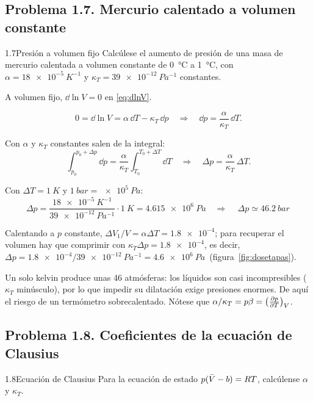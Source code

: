 \subsection{Problema 1.7. Mercurio calentado a volumen constante}
\begin{problema}{1.7}{Presión a volumen fijo}
Calcúlese el aumento de presión de una masa de mercurio calentada a volumen constante de
\SI{0}{\celsius} a \SI{1}{\celsius}, con $\alpha=\SI{18e-5}{K^{-1}}$ y $\kappa_T=\SI{39e-12}{Pa^{-1}}$ constantes.
\end{problema}

\begin{resolucion}
\idea A volumen fijo, $\dd\ln V=0$ en \eqref{eq:dlnV}.

\[
  0=\dd\ln V=\alpha\,\dd T-\kappa_T\,\dd p\quad\Longrightarrow\quad\dd p=\frac{\alpha}{\kappa_T}\,\dd T.
\]

 Con $\alpha$ y $\kappa_T$ constantes salen de la integral:
\[
  \int_{p_0}^{p_0+\Delta p}\dd p=\frac{\alpha}{\kappa_T}\int_{T_0}^{T_0+\Delta T}\dd T
  \quad\Longrightarrow\quad\Delta p=\frac{\alpha}{\kappa_T}\,\Delta T.
\]

 Con $\Delta T=\SI{1}{K}$ y $\SI{1}{bar}=\SI{e5}{Pa}$:
\[
  \Delta p=\frac{\SI{18e-5}{K^{-1}}}{\SI{39e-12}{Pa^{-1}}}\cdot\SI{1}{K}=\SI{4,615e6}{Pa}
  \quad\Longrightarrow\quad\boxed{\,\Delta p\simeq\SI{46,2}{bar}\,}
\]

 Calentando a $p$ constante, $\Delta V_1/V=\alpha\Delta T=\num{1,8e-4}$;
para recuperar el volumen hay que comprimir con $\kappa_T\Delta p=\num{1,8e-4}$, es decir,
$\Delta p=\num{1,8e-4}/\SI{39e-12}{Pa^{-1}}=\SI{4,6e6}{Pa}$\chk\ (figura~\ref{fig:dosetapas}).
\end{resolucion}

\begin{observacion}
Un solo kelvin produce unas 46 atmósferas: los líquidos son casi incompresibles ($\kappa_T$ minúsculo),
por lo que impedir su dilatación exige presiones enormes. De aquí el riesgo de un termómetro
sobrecalentado. Nótese que $\alpha/\kappa_T=p\beta=\bigl(\tfrac{\partial p}{\partial T}\bigr)_{V}$.
\end{observacion}

\subsection{Problema 1.8. Coeficientes de la ecuación de Clausius}
\begin{problema}{1.8}{Ecuación de Clausius}
Para la ecuación de estado $p(\bar{V}-b)=RT$, calcúlense $\alpha$ y $\kappa_T$.
\end{problema}

